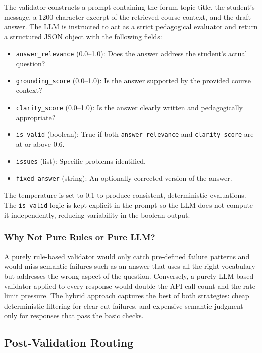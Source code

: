 \documentclass[12pt, a4paper]{article}
\begin{document}
The validator constructs a prompt containing the forum topic title, the student's message, a 1200-character excerpt of the retrieved course context, and the draft answer. The LLM is instructed to act as a strict pedagogical evaluator and return a structured JSON object with the following fields:

\begin{itemize}[leftmargin=1.5em, itemsep=2pt]
  \item \texttt{answer\_relevance} (0.0--1.0): Does the answer address the student's actual question?
  \item \texttt{grounding\_score} (0.0--1.0): Is the answer supported by the provided course context?
  \item \texttt{clarity\_score} (0.0--1.0): Is the answer clearly written and pedagogically appropriate?
  \item \texttt{is\_valid} (boolean): True if both \texttt{answer\_relevance} and \texttt{clarity\_score} are at or above 0.6.
  \item \texttt{issues} (list): Specific problems identified.
  \item \texttt{fixed\_answer} (string): An optionally corrected version of the answer.
\end{itemize}

The temperature is set to 0.1 to produce consistent, deterministic evaluations. The \texttt{is\_valid} logic is kept explicit in the prompt so the LLM does not compute it independently, reducing variability in the boolean output.

\subsubsection{Why Not Pure Rules or Pure LLM?}

A purely rule-based validator would only catch pre-defined failure patterns and would miss semantic failures such as an answer that uses all the right vocabulary but addresses the wrong aspect of the question. Conversely, a purely LLM-based validator applied to every response would double the API call count and the rate limit pressure. The hybrid approach captures the best of both strategies: cheap deterministic filtering for clear-cut failures, and expensive semantic judgment only for responses that pass the basic checks.

\subsection{Post-Validation Routing}
\end{document}
